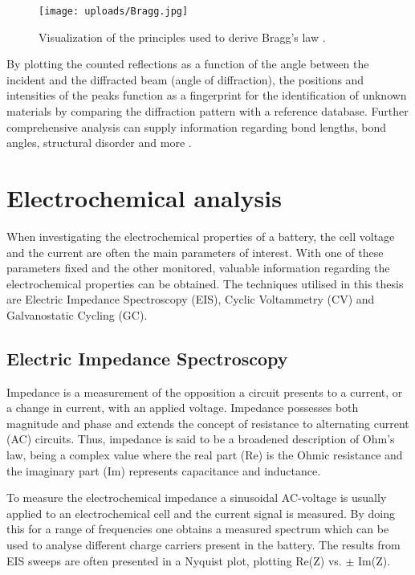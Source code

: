 \documentclass[Main/main.tex]{subfiles}
\begin{document}
\begin{figure}[ht]
    \centering
    \texttt{[image: uploads/Bragg.jpg]}
    \caption{Visualization of the principles used to derive Bragg's law \cite{Scotman}.}
    \label{fig:bragg}
\end{figure}

By plotting the counted reflections as a function of the angle between the incident and the diffracted beam (angle of diffraction), the positions and intensities of the peaks function as a fingerprint for the identification of unknown materials by comparing the diffraction pattern with a reference database. Further comprehensive analysis can supply information regarding bond lengths, bond angles, structural disorder and more \cite{Scotman}.



\section{Electrochemical analysis}
When investigating the electrochemical properties of a battery, the cell voltage and the current are often the main parameters of interest. With one of these parameters fixed and the other monitored, valuable information regarding the electrochemical properties can be obtained. The techniques utilised in this thesis are Electric Impedance Spectroscopy (EIS), Cyclic Voltammetry (CV) and Galvanostatic Cycling (GC).

\subsection{Electric Impedance Spectroscopy}
Impedance is a measurement of the opposition a circuit presents to a current, or a change in current, with an applied voltage. Impedance possesses both magnitude and phase and extends the concept of resistance to alternating current (AC) circuits. Thus, impedance is said to be a broadened description of Ohm's law, being a complex value where the real part (Re) is the Ohmic resistance and the imaginary part (Im) represents capacitance and inductance.

To measure the electrochemical impedance a sinusoidal AC-voltage is usually applied to an electrochemical cell and the current signal is measured. By doing this for a range of frequencies one obtains a measured spectrum which can be used to analyse different charge carriers present in the battery. The results from EIS sweeps are often presented in a Nyquist plot, plotting Re(Z) vs. $\pm$ Im(Z).
\end{document}
